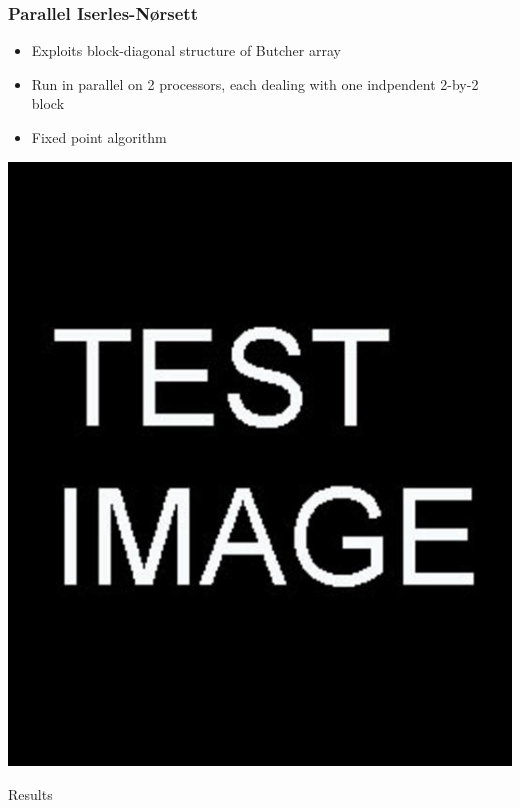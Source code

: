 \documentclass{beamer}
\begin{document}
\begin{frame} %
	\frametitle{Parallel Iserles-Nørsett}
	\begin{itemize}
		\item Exploits block-diagonal structure of Butcher array
		\item Run in parallel on 2 processors, each dealing with one indpendent 2-by-2 block
		\item Fixed point algorithm
	\end{itemize}
	\includegraphics[scale=0.2]{etc/test.jpg}
\end{frame}


\begin{frame}[c] %
\begin{center}
	\Huge \color{blue} Results
\end{center}
\end{frame}
\end{document}
